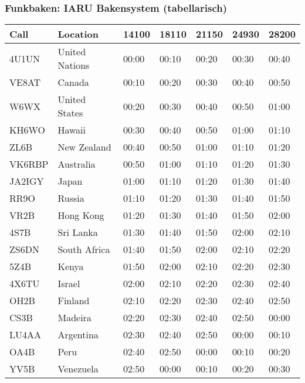 \begin{frame}
    \frametitle{Funkbaken: IARU Bakensystem\hyperlink{refs}{\cite{ibp}} (tabellarisch)}

    \begin{center}
    \footnotesize
    \begin{tabular}{|l|l|l|l|l|l|l|}\hline
        Call   & Location       & 14100 & 18110 & 21150 & 24930 & 28200 \\ \hline \hline
        4U1UN  & United Nations & 00:00 & 00:10 & 00:20 & 00:30 & 00:40 \\ \hline
        VE8AT  & Canada         & 00:10 & 00:20 & 00:30 & 00:40 & 00:50 \\ \hline
        W6WX   & United States  & 00:20 & 00:30 & 00:40 & 00:50 & 01:00 \\ \hline
        KH6WO  & Hawaii         & 00:30 & 00:40 & 00:50 & 01:00 & 01:10 \\ \hline
        ZL6B   & New Zealand    & 00:40 & 00:50 & 01:00 & 01:10 & 01:20 \\ \hline
        VK6RBP & Australia      & 00:50 & 01:00 & 01:10 & 01:20 & 01:30 \\ \hline
        JA2IGY & Japan          & 01:00 & 01:10 & 01:20 & 01:30 & 01:40 \\ \hline
        RR9O   & Russia         & 01:10 & 01:20 & 01:30 & 01:40 & 01:50 \\ \hline
        VR2B   & Hong Kong      & 01:20 & 01:30 & 01:40 & 01:50 & 02:00 \\ \hline
        4S7B   & Sri Lanka      & 01:30 & 01:40 & 01:50 & 02:00 & 02:10 \\ \hline
        ZS6DN  & South Africa   & 01:40 & 01:50 & 02:00 & 02:10 & 02:20 \\ \hline
        5Z4B   & Kenya          & 01:50 & 02:00 & 02:10 & 02:20 & 02:30 \\ \hline
        4X6TU  & Israel         & 02:00 & 02:10 & 02:20 & 02:30 & 02:40 \\ \hline
        OH2B   & Finland        & 02:10 & 02:20 & 02:30 & 02:40 & 02:50 \\ \hline
        CS3B   & Madeira        & 02:20 & 02:30 & 02:40 & 02:50 & 00:00 \\ \hline
        LU4AA  & Argentina      & 02:30 & 02:40 & 02:50 & 00:00 & 00:10 \\ \hline
        OA4B   & Peru           & 02:40 & 02:50 & 00:00 & 00:10 & 00:20 \\ \hline
        YV5B   & Venezuela      & 02:50 & 00:00 & 00:10 & 00:20 & 00:30 \\ \hline
    \end{tabular}
    \end{center}

\end{frame}

